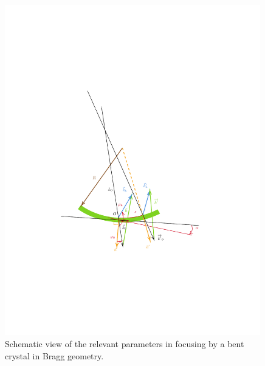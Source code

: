 \documentclass[preprint]{iucr}              %
\begin{document}
\begin{figure}
\label{fig:vectors}
\caption{Schematic view of the relevant parameters in focusing by a bent crystal in Bragg geometry.
}
\includegraphics[width=0.99\textwidth,trim=4cm 6cm 5cm 10cm,clip=true]{fig2.pdf}
\end{figure}
\end{document}
